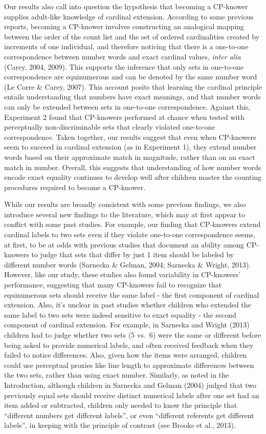 \documentclass[
  man,floatsintext]{apa7}
\begin{document}
Our results also call into question the hypothesis that becoming a CP-knower supplies adult-like knowledge of cardinal extension. According to some previous reports, becoming a CP-knower involves constructing an analogical mapping between the order of the count list and the set of ordered cardinalities created by increments of one individual, and therefore noticing that there is a one-to-one correspondence between number words and exact cardinal values, \emph{inter alia} (Carey, 2004, 2009). This supports the inference that only sets in one-to-one correspondence are equinumerous and can be denoted by the same number word (Le Corre \& Carey, 2007). This account posits that learning the cardinal principle entails understanding that numbers have exact meanings, and that number words can only be extended between sets in one-to-one correspondence. Against this, Experiment 2 found that CP-knowers performed at chance when tested with perceptually non-discriminable sets that clearly violated one-to-one correspondence. Taken together, our results suggest that even when CP-knowers seem to succeed in cardinal extension (as in Experiment 1), they extend number words based on their approximate match in magnitude, rather than on an exact match in number. Overall, this suggests that understanding of how number words encode exact equality continues to develop well after children master the counting procedures required to become a CP-knower.

While our results are broadly consistent with some previous findings, we also introduce several new findings to the literature, which may at first appear to conflict with some past studies. For example, our finding that CP-knowers extend cardinal labels to two sets even if they violate one-to-one correspondence seems, at first, to be at odds with previous studies that document an ability among CP-knowers to judge that sets that differ by just 1 item should be labeled by different number words (Sarnecka \& Gelman, 2004; Sarnecka \& Wright, 2013). However, like our study, these studies also found variability in CP-knowers' performance, suggesting that many CP-knowers fail to recognize that equinumerous sets should receive the same label - the first component of cardinal extension. Also, it's unclear in past studies whether children who extended the same label to two sets were indeed sensitive to exact equality - the second component of cardinal extension. For example, in Sarnecka and Wright (2013) children had to judge whether two sets (5 vs.~6) were the same or different before being asked to provide numerical labels, and often received feedback when they failed to notice differences. Also, given how the items were arranged, children could use perceptual proxies like line length to approximate differences between the two sets, rather than using exact number. Similarly, as noted in the Introduction, although children in Sarnecka and Gelman (2004) judged that two previously equal sets should receive distinct numerical labels after one set had an item added or subtracted, children only needed to know the principle that ``different numbers get different labels'', or even ``different referents get different labels'', in keeping with the principle of contrast (see Brooks et al., 2013).
\end{document}
